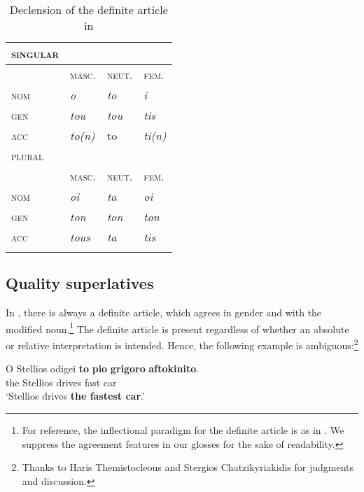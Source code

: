 \documentclass[output=paper
,modfonts
,nonflat]{langsci/langscibook}
\begin{document}
\begin{table}[h]
\caption{Declension of the definite article in }
\label{tab:coppockstrand:2}
\begin{tabularx}{0.5\textwidth}{ l X X X }
\lsptoprule
\textsc{singular} \\\midrule
& \textsc{masc.} & \textsc{neut.} & \textsc{fem.}\\\midrule
\textsc{nom} & \textit{o} & \textit{to} & \textit{i}\\
\textsc{gen} & \textit{tou} & \textit{tou} & \textit{tis}\\
\textsc{acc} & \textit{to(n)} & to & \textit{ti(n)}\\\midrule
\textsc{plural} \\\midrule
& \textsc{masc.} & \textsc{neut.} & \textsc{fem.}\\\midrule
\textsc{nom} & \textit{oi} & \textit{ta} & \textit{oi}\\
\textsc{gen} & \textit{ton} & \textit{ton} & \textit{ton}\\
\textsc{acc} & \textit{tous} & \textit{ta} & \textit{tis} \\\lspbottomrule
\end{tabularx}
\end{table}

\subsection{Quality superlatives}

In , there is always a definite article, which agrees in gender and  with the modified noun.\footnote{For reference, the inflectional paradigm for the definite article is as in . We suppress the agreement features in our glosses for the sake of readability.}
The definite article is present regardless of whether an absolute or relative interpretation is intended. Hence, the following example is ambiguous:\footnote{Thanks to Haris Themistocleous and Stergios Chatzikyriakidis for judgments and discussion.}

\ea \label{ex:coppockstrand:7}
\gll O Stellios odigei \textbf{to} \textbf{pio} \textbf{grigoro} \textbf{aftokinito}.\\
the Stellios drives  \cmpr{} fast car\\
\glt `Stellios drives \textbf{the fastest car}.'
\z
\end{document}
